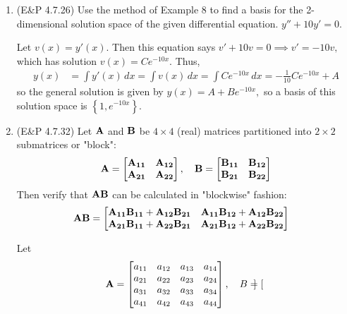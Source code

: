 \documentclass{article}
\begin{document}
\begin{enumerate}
	\item (E\&P 4.7.26) Use the method of Example 8 to find a basis for the 2-dimensional solution space of the given differential equation. $y''+10y'=0.$
		\begin{soln}
			Let $v(x)=y'(x).$ Then this equation says $v' + 10v=0\implies v' = -10v,$ which has solution $v(x)=Ce^{-10x}.$ Thus,
			\begin{align*}
				y(x) &= \int y'(x)\, dx = \int v(x)\, dx = \int Ce^{-10x}\, dx = -\frac{1}{10} Ce^{-10x} + A
			\end{align*}
			so the general solution is given by $y(x)=A+Be^{-10x},$ so a basis of this solution space is $\left\{ 1, e^{-10x} \right\}.$
		\end{soln}

	\item (E\&P 4.7.32) Let $\bf A$ and $\bf B$ be $4\times 4$ (real) matrices partitioned into $2\times 2$ submatrices or "block":
		\begin{align*}
			\bf A = \begin{bmatrix}
				\bf A_{11} & \bf A_{12} \\ \bf A_{21} & \bf A_{22}
			\end{bmatrix}, \quad \bf B = \begin{bmatrix}
				\bf B_{11} & \bf B_{12} \\ \bf B_{21} & \bf B_{22}
			\end{bmatrix}
		\end{align*}
		Then verify that $\bf{AB}$ can be calculated in "blockwise" fashion:
		\begin{align*}
			\bf{AB} &= \begin{bmatrix}
				\bf{A_{11}B_{11} + A_{12}B_{21}} & \bf{A_{11}B_{12} + A_{12}B_{22}} \\
				\bf{A_{21}B_{11} + A_{22}B_{21}} & \bf{A_{21}B_{12} + A_{22}B_{22}}
			\end{bmatrix}
		\end{align*}
		\begin{soln}
			Let
			\begin{align*}
				\bf A &= \begin{bmatrix}
					a_{11} & a_{12} & a_{13} & a_{14} \\
					a_{21} & a_{22} & a_{23} & a_{24} \\
					a_{31} & a_{32} & a_{33} & a_{34} \\
					a_{41} & a_{42} & a_{43} & a_{44}
				\end{bmatrix}, \quad B = \begin{bmatrix}

\end{bmatrix}
\end{align*}
\end{soln}
\end{enumerate}
\end{document}
